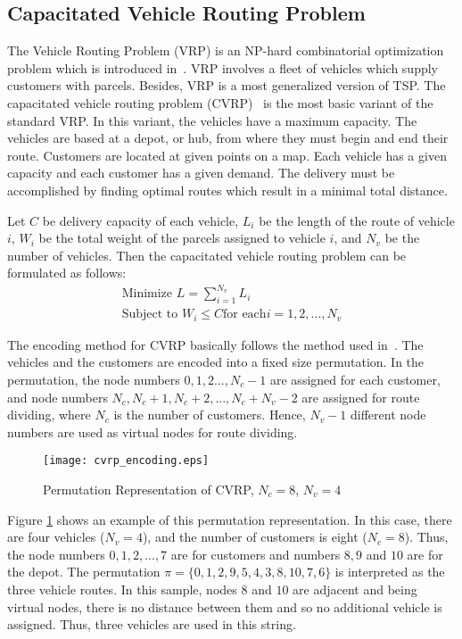\subsection{Capacitated Vehicle Routing Problem}
\label{section:cvrp}
The Vehicle Routing Problem (VRP) is an NP-hard combinatorial optimization problem which is introduced in~\cite{dantzig1959}. VRP involves a fleet of vehicles which supply customers with parcels.
Besides, VRP is a most generalized version of TSP. The capacitated vehicle routing problem (CVRP)~\cite{toth2001vehicle} is the most basic variant of the standard VRP. In this variant, the vehicles have a maximum capacity. The vehicles are based at a depot, or hub, from where they must begin and end their route. Customers are located at given points on a map. Each vehicle has a given capacity and each customer has a given demand. The delivery must be accomplished by finding optimal routes which result in a minimal total distance.

Let $C$ be delivery capacity of each vehicle, $L_i$ be the length of the route of vehicle $i$, $W_i$ be the total weight of the parcels assigned to vehicle $i$, and $N_v$ be the number of vehicles. Then the capacitated vehicle routing problem can be formulated as follows:
\begin{eqnarray*}
    \text{Minimize } L=\sum_{i=1}^{N_v}{L_i} \\
    \text{Subject to } W_i \leq C \text{for each} i = 1,2,...,N_v
\end{eqnarray*}

The encoding method for CVRP basically follows the method used in~\citep{tsutsui2004solving}. The vehicles and the customers are encoded into a fixed size permutation. In the permutation, the node numbers $0,1,2...,N_c-1$ are assigned for each customer, and node numbers $N_c, N_c+1, N_c+2,...,N_c+N_v-2$ are assigned for route dividing, where $N_c$ is the number of customers. Hence, $N_v-1$ different node numbers are used as virtual nodes for route dividing.

\begin{figure}[t]
    \centering
    \texttt{[image: cvrp\_encoding.eps]}
    \caption{Permutation Representation of CVRP, $N_c = 8$, $N_v = 4$}
	\label{fig:cvrp_encoding}
\end{figure}

Figure \ref{fig:cvrp_encoding} shows an example of this permutation representation. In this case, there are four vehicles ($N_v = 4$), and the number of customers is eight ($N_c =8$). Thus, the node numbers $0,1,2,...,7$ are for customers and numbers $8,9$ and $10$ are for the depot. The permutation $\pi = \{ 0,1,2,9,5,4,3,8,10,7,6 \}$ is interpreted as the three vehicle routes. In  this  sample, nodes $8$ and $10$ are adjacent and being virtual nodes, there is no distance between them and so no additional vehicle is assigned. Thus, three vehicles are used in this string. 


